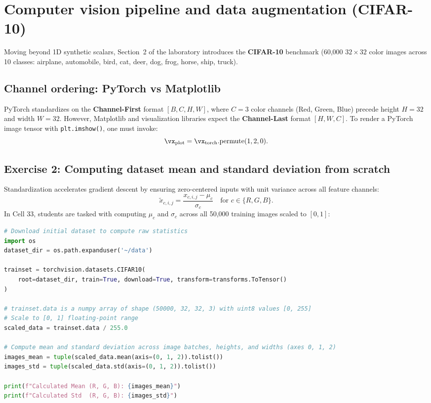 \documentclass[../labs.tex]{subfiles}
\begin{document}
\section{Computer vision pipeline and data augmentation (CIFAR-10)}

Moving beyond 1D synthetic scalars, Section~2 of the laboratory introduces the \textbf{CIFAR-10} benchmark (60,000 $32 \times 32$ color images across 10 classes: airplane, automobile, bird, cat, deer, dog, frog, horse, ship, truck).

\subsection{Channel ordering: PyTorch vs Matplotlib}
PyTorch standardizes on the \textbf{Channel-First} format $[B, C, H, W]$, where $C = 3$ color channels (Red, Green, Blue) precede height $H = 32$ and width $W = 32$. However, Matplotlib and visualization libraries expect the \textbf{Channel-Last} format $[H, W, C]$. To render a PyTorch image tensor with \texttt{plt.imshow()}, one must invoke:
\begin{equation}
\vx_{\text{plot}} = \vx_{\text{torch}}.\text{permute}(1, 2, 0).
\end{equation}

\subsection{Exercise 2: Computing dataset mean and standard deviation from scratch}
Standardization accelerates gradient descent by ensuring zero-centered inputs with unit variance across all feature channels:
\begin{equation}
\tilde{x}_{c, i, j} = \frac{x_{c, i, j} - \mu_c}{\sigma_c} \quad \text{for } c \in \{R, G, B\}.
\end{equation}
In Cell 33, students are tasked with computing $\mu_c$ and $\sigma_c$ across all 50,000 training images scaled to $[0, 1]$:

\begin{lstlisting}[language=Python, caption={Verified solution for calculating dataset mean and standard deviation per channel (Cell 33).}, label={lst:lab01_cifar_mean_std}]
# Download initial dataset to compute raw statistics
import os
dataset_dir = os.path.expanduser('~/data')

trainset = torchvision.datasets.CIFAR10(
    root=dataset_dir, train=True, download=True, transform=transforms.ToTensor()
)

# trainset.data is a numpy array of shape (50000, 32, 32, 3) with uint8 values [0, 255]
# Scale to [0, 1] floating-point range
scaled_data = trainset.data / 255.0

# Compute mean and standard deviation across image batches, heights, and widths (axes 0, 1, 2)
images_mean = tuple(scaled_data.mean(axis=(0, 1, 2)).tolist())
images_std = tuple(scaled_data.std(axis=(0, 1, 2)).tolist())

print(f"Calculated Mean (R, G, B): {images_mean}")
print(f"Calculated Std  (R, G, B): {images_std}")
\end{lstlisting}
\end{document}
